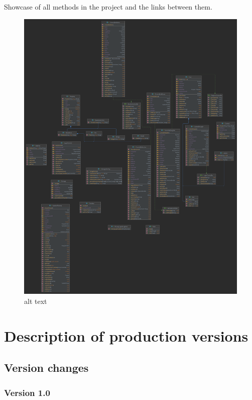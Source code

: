 \documentclass[
]{report}
\begin{document}
Showcase of all methods in the project and the links between them.

\begin{figure}
\centering
\includegraphics{diagrams/methodDiagram.png}
\caption{alt text}
\end{figure}

\hypertarget{description-of-production-versions}{%
\chapter{Description of production versions}\label{description-of-production-versions}}

\hypertarget{version-changes}{%
\section{Version changes}\label{version-changes}}

\hypertarget{version-1.0}{%
\subsection{Version 1.0}\label{version-1.0}}
\end{document}
